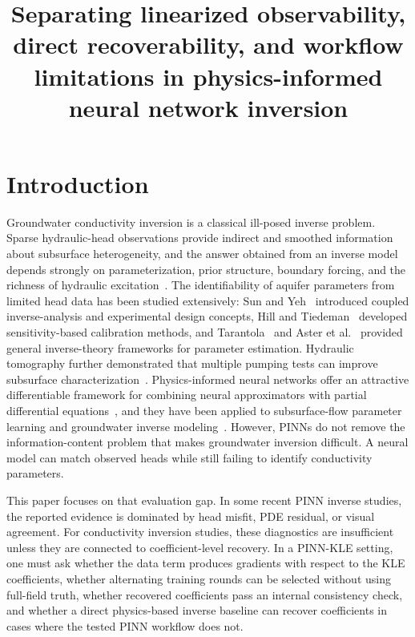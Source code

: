 \documentclass[pdflatex,sn-mathphys,Numbered,iicol]{sn-jnl}
\title[Separating observability and workflow limitations]{Separating linearized observability, direct recoverability, and workflow limitations in physics-informed neural network inversion}
\author*[1]{\fnm{Fei} \sur{Yang}}\email{yangf@cigem.cn}
\affil[1]{\orgname{China Institute of Geo-Environment Monitoring}, \orgdiv{China Geological Survey}, \street{Minzu University South Road}, \city{Beijing}, \postcode{100081}, \country{China}}
\begin{document}
\maketitle

\section{Introduction}
\label{sec:intro}

Groundwater conductivity inversion is a classical ill-posed inverse problem.
Sparse hydraulic-head observations provide indirect and smoothed information
about subsurface heterogeneity, and the answer obtained from an inverse model
depends strongly on parameterization, prior structure, boundary forcing, and
the richness of hydraulic excitation~\cite{mclaughlin1996reassessment,
carrera1986aquifer1, carrera1986aquifer2, kitanidis1995quasilinear,
zhou2014inverse, yeh2000hydraulic}. The identifiability of aquifer
parameters from limited head data has been studied extensively:
Sun and Yeh~\cite{sun1990identifiability} introduced coupled inverse-analysis
and experimental design concepts, Hill and
Tiedeman~\cite{hill2007effective} developed sensitivity-based calibration
methods, and Tarantola~\cite{tarantola2005inverse} and Aster et
al.~\cite{aster2018parameter} provided general inverse-theory frameworks for
parameter estimation. Hydraulic tomography further demonstrated that multiple
pumping tests can improve subsurface
characterization~\cite{zhu2005characterization, cardiff2013hydraulic,
yeh2015flow}. Physics-informed neural networks offer an attractive
differentiable framework for combining neural approximators with partial
differential equations~\cite{raissi2019pinn, karniadakis2021piml}, and they
have been applied to subsurface-flow parameter learning and groundwater
inverse modeling~\cite{tartakovsky2020subsurface, guo2023htpinn,
bandai2022forward, ji2024groundwater, gong2025klepinnc}. However, PINNs do
not remove the information-content problem that makes groundwater inversion
difficult. A neural model can match observed heads while still failing to
identify conductivity parameters.

This paper focuses on that evaluation gap. In some recent PINN inverse
studies, the reported evidence is dominated by head misfit, PDE residual, or
visual agreement. For conductivity inversion studies, these diagnostics are
insufficient unless they are connected to coefficient-level recovery. In a
PINN-KLE setting, one must ask whether the data term produces gradients with
respect to the KLE coefficients, whether alternating training rounds can be
selected without using full-field truth, whether recovered coefficients pass an
internal consistency check, and whether a direct physics-based inverse
baseline can recover coefficients in cases where the tested PINN workflow does
not.
\end{document}

